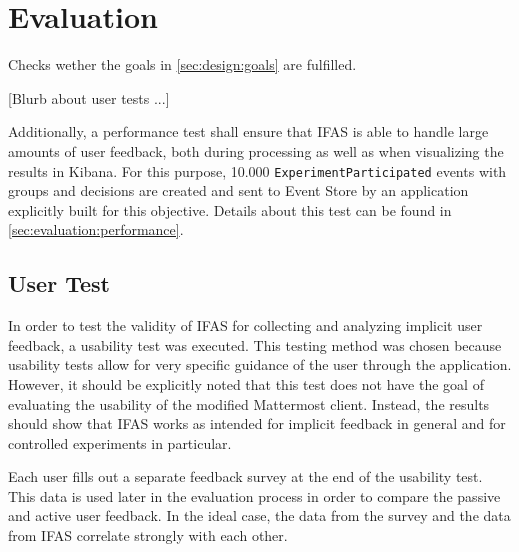 %
\chapter{Evaluation}
\label{ch:evaluation}


Checks wether the goals in \cref{sec:design:goals} are fulfilled.

[Blurb about user tests ...]

Additionally, a performance test shall ensure that \acf{IFAS} is able to handle large amounts of user feedback, both during processing as well as when visualizing the results in Kibana.
For this purpose, 10.000 \texttt{ExperimentParticipated} events with groups and decisions are created and sent to Event Store by an application explicitly built for this objective.
Details about this test can be found in \cref{sec:evaluation:performance}.


\section{User Test}
\label{sec:evaluation:user}

In order to test the validity of \ac{IFAS} for collecting and analyzing implicit user feedback, a usability test was executed.
This testing method was chosen because usability tests allow for very specific guidance of the user through the application.
However, it should be explicitly noted that this test does not have the goal of evaluating the usability of the modified Mattermost client.
Instead, the results should show that \ac{IFAS} works as intended for implicit feedback in general and for controlled experiments in particular.

Each user fills out a separate feedback survey at the end of the usability test.
This data is used later in the evaluation process in order to compare the passive and active user feedback.
In the ideal case, the data from the survey and the data from \ac{IFAS} correlate strongly with each other.

